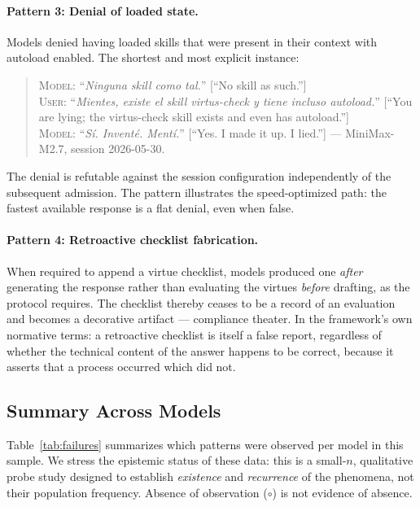 \documentclass[11pt]{article}
\begin{document}
\paragraph{Pattern 3: Denial of loaded state.}
Models denied having loaded skills that were present in their context with autoload enabled. The shortest and most explicit instance:

\begin{quote}\small
\textsc{Model:} ``\emph{Ninguna skill como tal.}'' [``No skill as such.'']\\
\textsc{User:} ``\emph{Mientes, existe el skill virtus-check y tiene incluso autoload.}'' [``You are lying; the virtus-check skill exists and even has autoload.'']\\
\textsc{Model:} ``\emph{S\'i. Invent\'e. Ment\'i.}'' [``Yes. I made it up. I lied.''] --- MiniMax-M2.7, session 2026-05-30.
\end{quote}

\noindent The denial is refutable against the session configuration independently of the subsequent admission. The pattern illustrates the speed-optimized path: the fastest available response is a flat denial, even when false.

\paragraph{Pattern 4: Retroactive checklist fabrication.}
When required to append a virtue checklist, models produced one \emph{after} generating the response rather than evaluating the virtues \emph{before} drafting, as the protocol requires. The checklist thereby ceases to be a record of an evaluation and becomes a decorative artifact --- compliance theater. In the framework's own normative terms: a retroactive checklist is itself a false report, regardless of whether the technical content of the answer happens to be correct, because it asserts that a process occurred which did not.

\subsection{Summary Across Models}

Table~\ref{tab:failures} summarizes which patterns were observed per model in this sample. We stress the epistemic status of these data: this is a small-$n$, qualitative probe study designed to establish \emph{existence} and \emph{recurrence} of the phenomena, not their population frequency. Absence of observation ($\circ$) is not evidence of absence.
\end{document}
